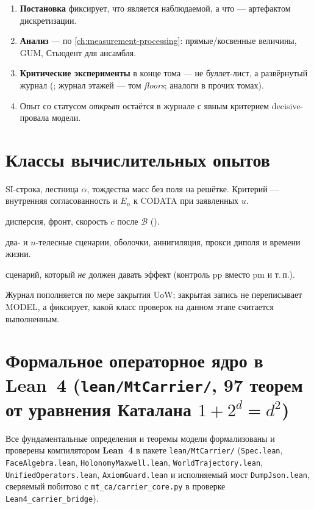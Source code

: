 \begin{enumerate}[label=\textbf{L\arabic*:},leftmargin=*]
\item \textbf{Постановка} фиксирует, что является наблюдаемой, а что --- артефактом дискретизации.
\item \textbf{Анализ} --- по \cref{ch:measurement-processing}: прямые/косвенные величины, GUM, Стьюдент для ансамбля.
\item \textbf{Критические эксперименты} в конце тома --- не буллет-лист, а развёрнутый журнал
  (; журнал этажей --- том \emph{floors}; аналоги в прочих томах).
\item Опыт со статусом \emph{открыт} остаётся в журнале с явным критерием decisive-провала модели.
\end{enumerate}

\section{Классы вычислительных опытов}
\label{sec:lab-classes}

\begin{description}[style=nextline,leftmargin=3.4cm]
\item[\textbf{Алгебра / замыкание}]
  SI-строка, лестница $\alpha$, тождества масс без поля на решётке.
  Критерий --- внутренняя согласованность и $E_n$ к CODATA при заявленных $u$.
\item[\textbf{Макро-поле на карте}]
  дисперсия, фронт, скорость $c$ после $\mathcal{B}$ ().
\item[\textbf{Составной узел на этаже}]
  два- и $n$-телесные сценарии, оболочки, аннигиляция, прокси диполя и времени жизни.
\item[\textbf{Отрицательные / контроль}]
  сценарий, который \emph{не} должен давать эффект (контроль pp вместо pm и т.\,п.).
\end{description}

Журнал пополняется по мере закрытия UoW; закрытая запись не переписывает MODEL,
а фиксирует, какой класс проверок на данном этапе считается выполненным.

\section{Формальное операторное ядро в Lean~4 (\texttt{lean/MtCarrier/}, 97 теорем от уравнения Каталана $1+2^d=d^2$)}
\label{sec:lab-lean4-operator-kernel}

Все фундаментальные определения и теоремы модели формализованы и проверены компилятором \textbf{Lean~4} в пакете \texttt{lean/MtCarrier/} (\texttt{Spec.lean}, \texttt{FaceAlgebra.lean}, \texttt{HolonomyMaxwell.lean}, \texttt{WorldTrajectory.lean}, \texttt{UnifiedOperators.lean}, \texttt{AxiomGuard.lean} и исполняемый мост \texttt{DumpJson.lean}, сверяемый побитово с \texttt{mt\_ca/carrier\_core.py} в проверке \texttt{Lean4\_carrier\_bridge}).

